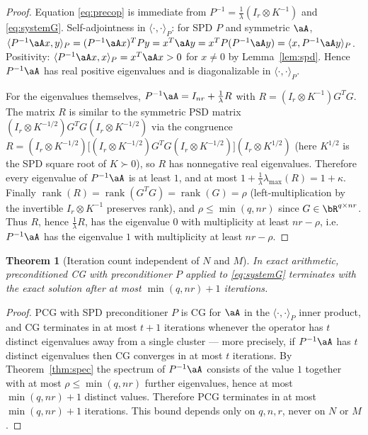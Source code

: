 \documentclass[12pt]{article}
\newtheorem{theorem}{Theorem}
\theoremstyle{definition}
\begin{document}
\begin{proof}
Equation \eqref{eq:precop} is immediate from
$P^{-1}=\tfrac1\lambda(I_r\otimes K^{-1})$ and \eqref{eq:systemG}.
Self-adjointness in $\langle\cdot,\cdot\rangle_P$: for SPD $P$ and symmetric
$\aA$, $\langle P^{-1}\aA x,y\rangle_P=(P^{-1}\aA x)^{T}Py=x^{T}\aA y
=x^{T}P(P^{-1}\aA y)=\langle x,P^{-1}\aA y\rangle_P$. Positivity:
$\langle P^{-1}\aA x,x\rangle_P=x^{T}\aA x>0$ for $x\neq0$ by
Lemma~\ref{lem:spd}. Hence $P^{-1}\aA$ has real positive eigenvalues and is
diagonalizable in $\langle\cdot,\cdot\rangle_P$.

For the eigenvalues themselves, $P^{-1}\aA=I_{nr}+\tfrac1\lambda R$ with
$R=(I_r\otimes K^{-1})G^{T}G$. The matrix $R$ is similar to the symmetric PSD
matrix $(I_r\otimes K^{-1/2})G^{T}G(I_r\otimes K^{-1/2})$ via the congruence
$R=(I_r\otimes K^{-1/2})\big[(I_r\otimes K^{-1/2})G^{T}G(I_r\otimes
K^{-1/2})\big](I_r\otimes K^{1/2})$ (here $K^{1/2}$ is the SPD square root of
$K\succ0$), so $R$ has nonnegative real eigenvalues. Therefore every eigenvalue
of $P^{-1}\aA$ is at least $1$, and at most
$1+\tfrac1\lambda\lambda_{\max}(R)=1+\kappa$.
Finally $\operatorname{rank}(R)=\operatorname{rank}(G^{T}G)=\operatorname{rank}(G)=\rho$
(left-multiplication by the invertible $I_r\otimes K^{-1}$ preserves rank), and
$\rho\le\min(q,nr)$ since $G\in\bR^{q\times nr}$. Thus $R$, hence $\tfrac1\lambda
R$, has the eigenvalue $0$ with multiplicity at least $nr-\rho$, i.e.
$P^{-1}\aA$ has the eigenvalue $1$ with multiplicity at least $nr-\rho$.
\end{proof}

\begin{theorem}[Iteration count independent of $N$ and $M$]\label{thm:iters}
In exact arithmetic, preconditioned CG with preconditioner $P$ applied to
\eqref{eq:systemG} terminates with the exact solution after at most
$\min(q,nr)+1$ iterations.
\end{theorem}

\begin{proof}
PCG with SPD preconditioner $P$ is CG for $\aA$ in the $\langle\cdot,\cdot\rangle_P$
inner product, and CG terminates in at most $t+1$ iterations whenever the
operator has $t$ distinct eigenvalues away from a single cluster — more
precisely, if $P^{-1}\aA$ has $t$ distinct eigenvalues then CG converges in at
most $t$ iterations. By Theorem~\ref{thm:spec} the spectrum of $P^{-1}\aA$
consists of the value $1$ together with at most $\rho\le\min(q,nr)$ further
eigenvalues, hence at most $\min(q,nr)+1$ distinct values. Therefore PCG
terminates in at most $\min(q,nr)+1$ iterations. This bound depends only on
$q,n,r$, never on $N$ or $M$.
\end{proof}
\end{document}

